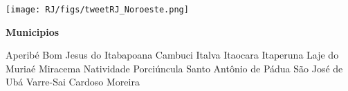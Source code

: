 \documentclass[10pt]{article} %
\begin{document}
\begin{minipage}[t]{.66\linewidth}
\begin{center}
\texttt{[image: RJ/figs/tweetRJ\_Noroeste.png]}\end{center}
\end{minipage}\hfill\begin{minipage}[t]{.30\linewidth}
\begin{mdframed}[style=sidebar,frametitle={}]
\textbf{Municipios}\begin{itemize}\wsquare Aperibé 
\wsquare Bom Jesus do Itabapoana 
\wsquare Cambuci 
\wsquare Italva 
\wsquare Itaocara 
\ysquare Itaperuna 
\wsquare Laje do Muriaé 
\wsquare Miracema 
\ysquare Natividade 
\rgsquare Porciúncula 
\wsquare Santo Antônio de Pádua 
\wsquare São José de Ubá 
\wsquare Varre-Sai 
\wsquare Cardoso Moreira 
\end{itemize}\BackToContents\end{mdframed}\hfill\end{minipage}\newpage


 
      \hypertarget{municips}{}

      
     \begin{center}
            
     \end{center}


      \BackToContents %


\newpage

\end{document}
